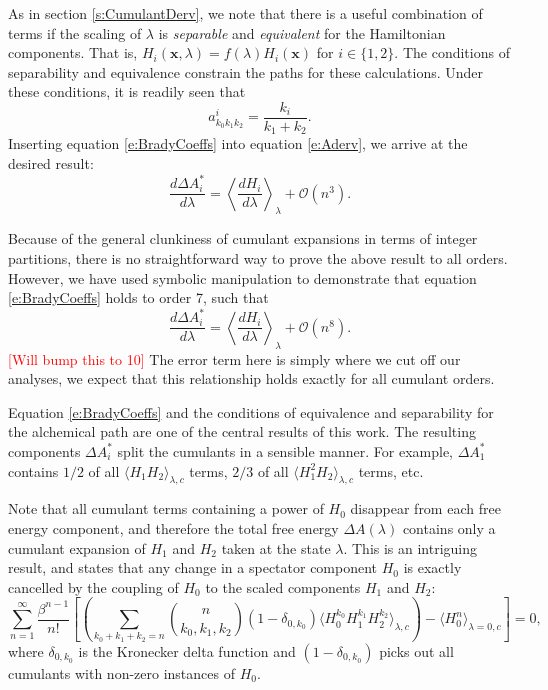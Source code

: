 \documentclass[%
 preprint,
 amsmath,amssymb,
 aps,
]{revtex4-1}
\newcommand{\warning}[1]{{\textsf{{\textcolor{red}{{[#1]}{}}}}}}
\renewcommand{\vec}[1]{{\bm{#1}}}
\begin{document}
As in section \ref{s:CumulantDerv}, we note that there is a useful combination of terms if the scaling of $\lambda$ is \emph{separable} and \emph{equivalent} for the Hamiltonian components.  That is, $H_i \left( \vec{x}, \lambda \right) = f(\lambda) H_i \left( \vec{x}\right) $
for $i \in \{1,2\}$.  The conditions of separability and equivalence constrain the paths for these calculations.  Under these conditions, it is readily seen that 
\begin{equation}
a^i_{k_0k_1k_2} = \frac{k_i}{k_1+k_2}. 
\label{e:BradyCoeffs}
\end{equation}
Inserting equation \ref{e:BradyCoeffs} into equation \ref{e:Aderv}, we arrive at the desired result:
\begin{equation}
\frac{d \Delta A^*_i}{d \lambda} =   \left\langle \frac{dH_i}{d \lambda} \right \rangle_{\lambda} + \mathcal{O} (n^3). 
\label{e:BradyProof}
\end{equation}

Because of the general clunkiness of cumulant expansions in terms of integer partitions, there is no straightforward way to prove the above result to all orders.  However, we have used symbolic manipulation to demonstrate that equation \ref{e:BradyCoeffs} holds to order 7, such that
\begin{equation}
\frac{d \Delta A^*_i}{d \lambda} =   \left\langle \frac{dH_i}{d \lambda} \right \rangle_{\lambda} + \mathcal{O} (n^8). 
\label{e:BradyProof2}
\end{equation}
\warning{Will bump this to 10}
The error term here is simply where we cut off our analyses, we expect that this relationship holds exactly for all cumulant orders.  

Equation \ref{e:BradyCoeffs} and the conditions of equivalence and separability for the alchemical path are one of the central results of this work. The resulting components $\Delta A^*_i$ split the cumulants in a sensible manner.  For example, $\Delta A^*_1$ contains $1/2$ of all $\langle  H_1 H_2\rangle_{\lambda,c}$ terms, $2/3$ of all $\langle  H_1^2 H_2\rangle_{\lambda,c}$ terms, etc. 

Note that all cumulant terms containing a power of $H_0$ disappear from each free energy component, and therefore 
the total free energy $\Delta A (\lambda) $ contains only a cumulant expansion of $H_1$ and $H_2$ taken at the state $\lambda$. 
This is an intriguing result, and states that any change in a spectator component $H_0$ is exactly cancelled by the coupling of $H_0$ to the scaled components $H_1$ and $H_2$:
 \begin{equation}
\sum_{n=1}^{\infty}  \frac{\beta^{n-1}}{n!} 
\left[
\left(
 \sum_{k_0+k_1+k_2=n} 
{ n \choose k_0,k_1,k_2 } \left( 1- \delta_{0,k_0}  \right) \langle  H_0^{k_0} H_1^{k_1} H_2^{k_2} \rangle_{\lambda,c}
\right)
-  \langle  H_0^{n}  \rangle_{\lambda=0,c} \right] = 0,
\label{e:SpectatorCancellation}
\end{equation}
where $\delta_{0,k_0} $ is the Kronecker delta function and $ \left( 1- \delta_{0,k_0}  \right)$ picks out all cumulants with non-zero instances of $H_0$. 
\end{document}
